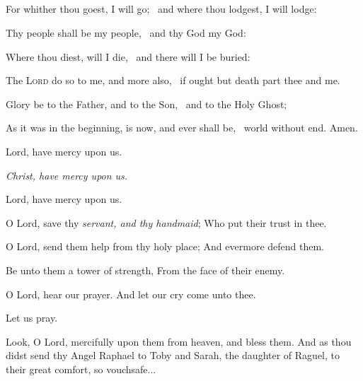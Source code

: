 \medskip
\centerline{}

\subsection[{The Song of Ruth}]{}

For whither thou goest, I will go; \star\ and where thou lodgest, I will lodge:

Thy people shall be my people, \star\ and thy God my God:

Where thou diest, will I die, \star\ and there will I be buried:

The {\scshape Lord} do so to me, and more also,  \star\  if ought but death part thee and me.

Glory be to the Father, and to the Son, \star\  and to the Holy Ghost;

As it was in the beginning, is now, and ever shall be, \star\  world without end. Amen.

\bigskip

\centerline{Lord, have mercy upon us.}
\centerline{\emph{Christ, have mercy upon us.}}
\centerline{Lord, have mercy upon us.}

\medskip

\ourFather

\smallskip

\V O Lord, save thy \emph{servant, and thy handmaid}; \R Who put their trust in thee.

\V O Lord, send them help from thy holy place; \R And evermore defend them.

\V Be unto them a tower of strength, \R From the face of their enemy.

\V O Lord, hear our prayer. \R And let our cry come unto thee.

\centerline{Let us pray.}


Look, O Lord, mercifully upon them from heaven, and bless them. 
And as thou didst send thy Angel Raphael to Toby and Sarah, the daughter of Raguel, to their great comfort, so vouchsafe... %


